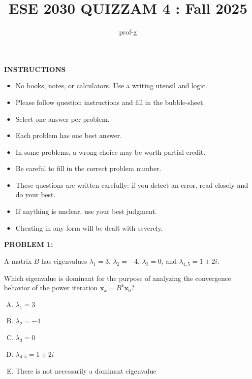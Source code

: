 \documentclass[12pt]{amsart}
\title{ESE 2030 QUIZZAM 4 : Fall 2025}
\author{prof-g}
\begin{document}
\maketitle

\begin{center}
    {\bf INSTRUCTIONS}
\end{center}

\begin{itemize}
\item 
No books, notes, or calculators. Use a writing utensil and logic. 

\item 
Please follow question instructions and fill in the bubble-sheet. 

\item 
Select one answer per problem.

\item 
Each problem has one best answer. 

\item 
In some problems, a wrong choice may be worth partial credit. 

\item 
Be careful to fill in the correct problem number. 

\item 
These questions are written carefully: if you detect an error, read closely and do your best.

\item 
If anything is unclear, use your best judgment. 

\item 
Cheating in any form will be dealt with severely. 
\end{itemize}

\newpage





{\bf PROBLEM 1:}

A matrix $B$ has eigenvalues $\lambda_1 = 3$, $\lambda_2 = -4$, $\lambda_3 = 0$, and $\lambda_{4,5} = 1 \pm 2i$.

Which eigenvalue is dominant for the purpose of analyzing the convergence behavior of the power iteration $\mathbf{x}_k = B^k\mathbf{x}_0$?

\begin{enumerate}[(A)]
\item $\lambda_1 = 3$
\item $\lambda_2 = -4$
\item $\lambda_3 = 0$
\item $\lambda_{4,5} = 1 \pm 2i$
\item There is not necessarily a dominant eigenvalue
\end{enumerate}
\end{document}
